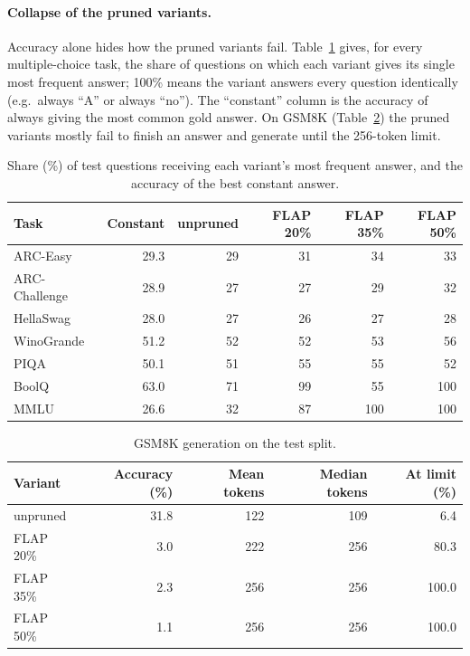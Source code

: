 \paragraph{Collapse of the pruned variants.} Accuracy alone hides how the pruned variants fail. Table~\ref{tab:collapse} gives, for every multiple-choice task, the share of questions on which each variant gives its single most frequent answer; 100\% means the variant answers every question identically (e.g.\ always ``A'' or always ``no''). The ``constant'' column is the accuracy of always giving the most common gold answer. On GSM8K (Table~\ref{tab:gsm8k}) the pruned variants mostly fail to finish an answer and generate until the 256-token limit.

\begin{table}[!htbp]\centering\small
\begin{tabular}{lrrrrr}
\toprule
Task & Constant & unpruned & FLAP 20\% & FLAP 35\% & FLAP 50\% \\
\midrule
ARC-Easy & 29.3 & 29 & 31 & 34 & 33 \\
ARC-Challenge & 28.9 & 27 & 27 & 29 & 32 \\
HellaSwag & 28.0 & 27 & 26 & 27 & 28 \\
WinoGrande & 51.2 & 52 & 52 & 53 & 56 \\
PIQA & 50.1 & 51 & 55 & 55 & 52 \\
BoolQ & 63.0 & 71 & 99 & 55 & 100 \\
MMLU & 26.6 & 32 & 87 & 100 & 100 \\
\bottomrule
\end{tabular}
\caption{Share (\%) of test questions receiving each variant's most frequent answer, and the accuracy of the best constant answer.}\label{tab:collapse}
\end{table}

\begin{table}[!htbp]\centering\small
\begin{tabular}{lrrrr}
\toprule
Variant & Accuracy (\%) & Mean tokens & Median tokens & At limit (\%) \\
\midrule
unpruned & 31.8 & 122 & 109 & 6.4 \\
FLAP 20\% & 3.0 & 222 & 256 & 80.3 \\
FLAP 35\% & 2.3 & 256 & 256 & 100.0 \\
FLAP 50\% & 1.1 & 256 & 256 & 100.0 \\
\bottomrule
\end{tabular}
\caption{GSM8K generation on the test split.}\label{tab:gsm8k}
\end{table}

